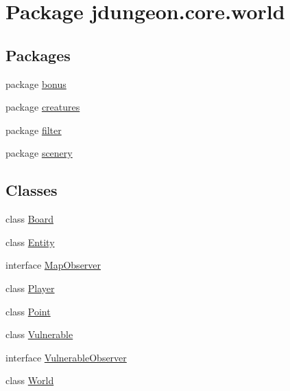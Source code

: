 \hypertarget{namespacejdungeon_1_1core_1_1world}{
\section{Package jdungeon.core.world}
\label{namespacejdungeon_1_1core_1_1world}
}
\subsection*{Packages}
\begin{DoxyCompactItemize}
\item 
package \hyperlink{namespacejdungeon_1_1core_1_1world_1_1bonus}{bonus}
\item 
package \hyperlink{namespacejdungeon_1_1core_1_1world_1_1creatures}{creatures}
\item 
package \hyperlink{namespacejdungeon_1_1core_1_1world_1_1filter}{filter}
\item 
package \hyperlink{namespacejdungeon_1_1core_1_1world_1_1scenery}{scenery}
\end{DoxyCompactItemize}
\subsection*{Classes}
\begin{DoxyCompactItemize}
\item 
class \hyperlink{classjdungeon_1_1core_1_1world_1_1_board}{Board}
\item 
class \hyperlink{classjdungeon_1_1core_1_1world_1_1_entity}{Entity}
\item 
interface \hyperlink{interfacejdungeon_1_1core_1_1world_1_1_map_observer}{MapObserver}
\item 
class \hyperlink{classjdungeon_1_1core_1_1world_1_1_player}{Player}
\item 
class \hyperlink{classjdungeon_1_1core_1_1world_1_1_point}{Point}
\item 
class \hyperlink{classjdungeon_1_1core_1_1world_1_1_vulnerable}{Vulnerable}
\item 
interface \hyperlink{interfacejdungeon_1_1core_1_1world_1_1_vulnerable_observer}{VulnerableObserver}
\item 
class \hyperlink{classjdungeon_1_1core_1_1world_1_1_world}{World}
\end{DoxyCompactItemize}
